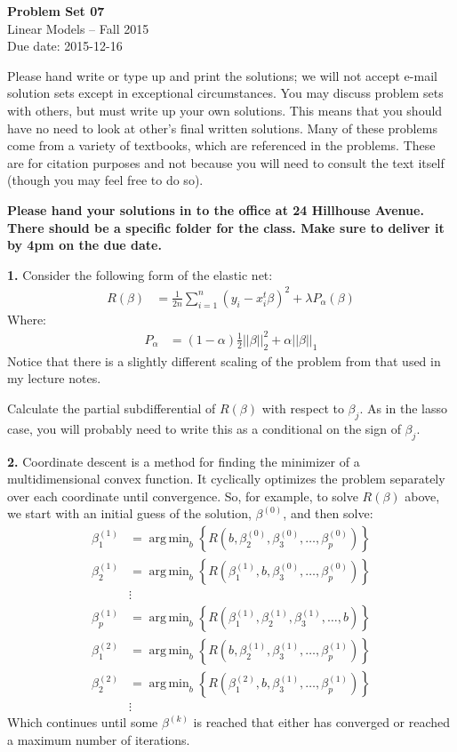 \documentclass[12pt]{article}
\newcommand{\argmin}{\mathop{\mathrm{arg\,min}}}
\begin{document}
\begin{center}
{\bf Problem Set 07} \\
Linear Models -- Fall 2015 \\
Due date: 2015-12-16
\end{center}

\medskip

Please hand write or type up and print the solutions; we will not accept e-mail solution sets except
in exceptional circumstances. You may discuss problem sets with others, but must
write up your own solutions. This means that you should have no need to look at other's
final written solutions. Many of these problems come from a variety of textbooks,
which are referenced in the problems. These are for citation purposes and not because
you will need to consult the text itself (though you may feel free to do so).

\textbf{Please hand your solutions in to the office at 24 Hillhouse Avenue. There should be
a specific folder for the class. Make sure to deliver it by 4pm on the due date.}

\medskip

\textbf{1.} Consider the following form of the elastic net:
\begin{align*}
R(\beta) &= \frac{1}{2n} \sum_{i=1}^n ( y_i - x^t_i \beta)^2 + \lambda P_\alpha (\beta)
\end{align*}
Where:
\begin{align*}
P_\alpha &= (1 - \alpha) \frac{1}{2} || \beta ||_2^2 + \alpha || \beta ||_1
\end{align*}
Notice that there is a slightly different scaling of the problem from that used in my lecture
notes.

Calculate the partial subdifferential of $R(\beta)$ with respect to $\beta_j$. As in the
lasso case, you will probably need to write this as a conditional on the sign of $\beta_j$.

\textbf{2.} Coordinate descent is a method for finding the minimizer of a multidimensional
convex function. It cyclically optimizes the problem separately over each coordinate until
convergence. So, for example, to solve $R(\beta)$ above, we start with an initial guess of
the solution, $\beta^{(0)}$, and then solve:
\begin{align*}
\beta^{(1)}_1 &= \argmin_b \left\{R(b, \beta^{(0)}_2, \beta^{(0)}_3, \ldots, \beta^{(0)}_p) \right\} \\
\beta^{(1)}_2 &= \argmin_b \left\{R(\beta^{(1)}_1, b, \beta^{(0)}_3, \ldots, \beta^{(0)}_p) \right\} \\
&\vdots \\
\beta^{(1)}_p &= \argmin_b \left\{R(\beta^{(1)}_1, \beta^{(1)}_2, \beta^{(1)}_3, \ldots, b) \right\} \\
\beta^{(2)}_1 &= \argmin_b \left\{R(b, \beta^{(1)}_2, \beta^{(1)}_3, \ldots, \beta^{(1)}_p) \right\} \\
\beta^{(2)}_2 &= \argmin_b \left\{R(\beta^{(2)}_1, b, \beta^{(1)}_3, \ldots, \beta^{(1)}_p) \right\} \\
&\vdots
\end{align*}
Which continues until some $\beta^{(k)}$ is reached that either has converged or reached a maximum
number of iterations.
\end{document}
